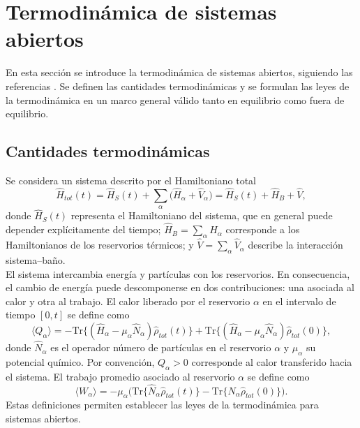 \label{sec:lindblad}

\section{Termodinámica de sistemas abiertos}
\label{termogeneral}
En esta sección se introduce la termodinámica de sistemas abiertos, siguiendo las referencias \cite{esposito2010entropy,potts2021thermodynamically}. Se definen las cantidades termodinámicas y se formulan las leyes de la termodinámica en un marco general válido tanto en equilibrio como fuera de equilibrio. 

\subsection{Cantidades termodinámicas}
\label{cantidadestermo}
Se considera un sistema descrito por el Hamiltoniano total
\begin{equation*}
    \hat{H}_{tot}(t) = \hat{H}_{S}(t) + \sum_{\alpha}\big(\hat{H}_{\alpha} + \hat{V}_{\alpha}\big)  
    = \hat{H}_{S}(t) + \hat{H}_{B} + \hat{V},
\end{equation*}
donde $\hat{H}_{S}(t)$ representa el Hamiltoniano del sistema, que en general puede depender explícitamente del tiempo; $\hat{H}_{B}=\sum_{\alpha}\hat{H}_{\alpha}$ corresponde a los Hamiltonianos de los reservorios térmicos; y $\hat{V}=\sum_{\alpha}\hat{V}_{\alpha}$ describe la interacción sistema–baño.
\\

El sistema intercambia energía y partículas con los reservorios. En consecuencia, el cambio de energía puede descomponerse en dos contribuciones: una asociada al calor y otra al trabajo. El calor liberado por el reservorio $\alpha$ en el intervalo de tiempo $[0,t]$ se define como
\begin{equation}
    \langle Q_{\alpha}\rangle = - \text{Tr}\{(\hat{H}_{\alpha} - \mu_{\alpha}\hat{N}_{\alpha})\hat{\rho}_{tot}(t) \} 
    + \text{Tr}\{(\hat{H}_{\alpha} - \mu_{\alpha}\hat{N}_{\alpha})\hat{\rho}_{tot}(0) \},
    \label{sec3:calor}
\end{equation}
donde $\hat{N}_{\alpha}$ es el operador número de partículas en el reservorio $\alpha$ y $\mu_{\alpha}$ su potencial químico. Por convención, $Q_{\alpha}>0$ corresponde al calor transferido hacia el sistema. El trabajo promedio asociado al reservorio $\alpha$ se define como
\begin{equation}
    \langle W_{\alpha}\rangle = - \mu_{\alpha} \Big( \text{Tr}\{\hat{N}_{\alpha} \hat{\rho}_{tot}(t) \} - \text{Tr}\{\hat{N}_{\alpha}\hat{\rho}_{tot}(0) \}\Big).
    \label{sec3:trabajo}
\end{equation}
Estas definiciones permiten establecer las leyes de la termodinámica para sistemas abiertos.
\label{Leyestermo}

